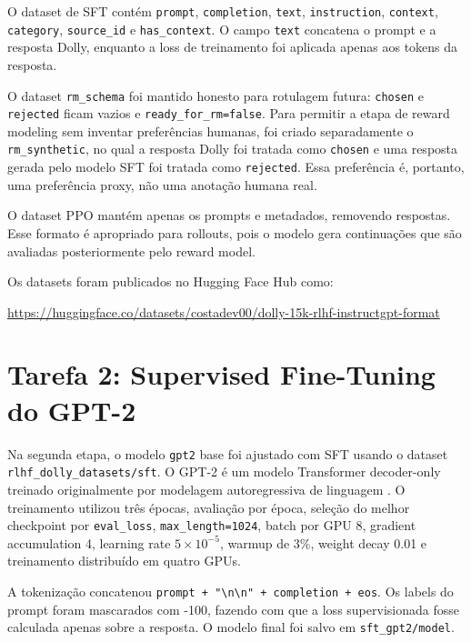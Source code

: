 \documentclass[a4paper,12pt]{article}
\begin{document}
O dataset de SFT contém \texttt{prompt}, \texttt{completion}, \texttt{text}, \texttt{instruction}, \texttt{context}, \texttt{category}, \texttt{source\_id} e \texttt{has\_context}. O campo \texttt{text} concatena o prompt e a resposta Dolly, enquanto a loss de treinamento foi aplicada apenas aos tokens da resposta.

O dataset \texttt{rm\_schema} foi mantido honesto para rotulagem futura: \texttt{chosen} e \texttt{rejected} ficam vazios e \texttt{ready\_for\_rm=false}. Para permitir a etapa de reward modeling sem inventar preferências humanas, foi criado separadamente o \texttt{rm\_synthetic}, no qual a resposta Dolly foi tratada como \texttt{chosen} e uma resposta gerada pelo modelo SFT foi tratada como \texttt{rejected}. Essa preferência é, portanto, uma preferência proxy, não uma anotação humana real.

O dataset PPO mantém apenas os prompts e metadados, removendo respostas. Esse formato é apropriado para rollouts, pois o modelo gera continuações que são avaliadas posteriormente pelo reward model.

Os datasets foram publicados no Hugging Face Hub como:

\begin{center}
\url{https://huggingface.co/datasets/costadev00/dolly-15k-rlhf-instructgpt-format}
\end{center}

\section{Tarefa 2: Supervised Fine-Tuning do GPT-2}

Na segunda etapa, o modelo \texttt{gpt2} base foi ajustado com SFT usando o dataset \texttt{rlhf\_dolly\_datasets/sft}. O GPT-2 é um modelo Transformer decoder-only treinado originalmente por modelagem autoregressiva de linguagem \cite{radford2019language}. O treinamento utilizou três épocas, avaliação por época, seleção do melhor checkpoint por \texttt{eval\_loss}, \texttt{max\_length=1024}, batch por GPU 8, gradient accumulation 4, learning rate $5 \times 10^{-5}$, warmup de 3\%, weight decay 0.01 e treinamento distribuído em quatro GPUs.

A tokenização concatenou \texttt{prompt + "\textbackslash n\textbackslash n" + completion + eos}. Os labels do prompt foram mascarados com -100, fazendo com que a loss supervisionada fosse calculada apenas sobre a resposta. O modelo final foi salvo em \texttt{sft\_gpt2/model}.
\end{document}

